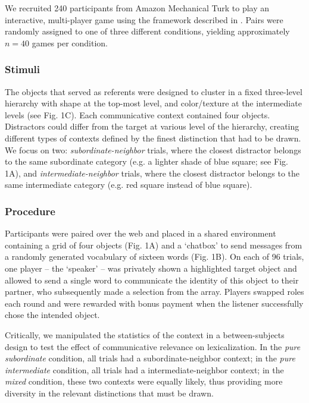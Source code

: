 \documentclass[10pt,letterpaper]{article}
\begin{document}
We recruited 240 participants from Amazon Mechanical Turk to play an interactive, multi-player game using the framework described in \cite{Hawkins15_RealTimeWebExperiments}. Pairs were randomly assigned to one of three different conditions, yielding approximately $n=40$ games per condition.

\subsubsection{Stimuli}

The objects that served as referents were designed to cluster in a fixed three-level hierarchy with shape at the top-most level, and color/texture at the intermediate levels (see Fig. 1C). Each communicative context contained four objects. Distractors could differ from the target at various level of the hierarchy, creating different types of contexts defined by the finest distinction that had to be drawn. We focus on two: \emph{subordinate-neighbor} trials, where the closest distractor belongs to the same subordinate category (e.g. a lighter shade of blue square; see Fig. 1A), and \emph{intermediate-neighbor} trials, where the closest distractor belongs to the same intermediate category (e.g. red square instead of blue square). 

\subsubsection{Procedure}

Participants were paired over the web and placed in a shared environment containing a grid of four objects (Fig. 1A) and a `chatbox' to send messages from a randomly generated vocabulary of sixteen words (Fig. 1B). On each of 96 trials, one player -- the `speaker' -- was privately shown a highlighted target object and allowed to send a single word to communicate the identity of this object to their partner, who subsequently made a selection from the array. Players swapped roles each round and were rewarded with bonus payment when the listener successfully chose the intended object.

Critically, we manipulated the statistics of the context in a between-subjects design to test the effect of communicative relevance on lexicalization. In the \emph{pure subordinate} condition, all trials had a subordinate-neighbor context; in the \emph{pure intermediate} condition, all trials had a intermediate-neighbor context; in the \emph{mixed} condition, these two contexts were equally likely, thus providing more diversity in the relevant distinctions that must be drawn. 
\end{document}
